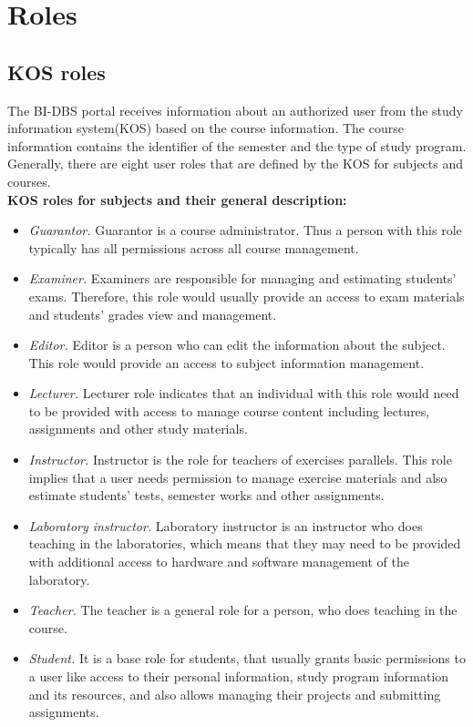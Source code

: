\section{Roles} 

\subsection{KOS roles}
The BI-DBS portal receives information about an authorized user from the study information system(KOS) based on the course information. The course information contains the identifier of the semester and the type of study program. Generally, there are eight user roles that are defined by the KOS for subjects and courses.\cite{kosapi}\\

\noindent \textbf{KOS roles for subjects and their general description:\cite{usermapapi}}

\begin{itemize}
    \item \emph{Guarantor.} Guarantor is a course administrator. Thus a person with this role typically has all permissions across all course management.
    \item \emph{Examiner.} Examiners are responsible for managing and estimating students' exams. Therefore, this role would usually provide an access to exam materials and students' grades view and management.
    \item \emph{Editor.} Editor is a person who can edit the information about the subject. This role would provide an access to subject information management.
    \item \emph{Lecturer.} Lecturer role indicates that an individual with this role would need to be provided with access to manage course content including lectures, assignments and other study materials.
    \item \emph{Instructor.} Instructor is the role for teachers of exercises parallels. This role implies that a user needs permission to manage exercise materials and also estimate students' tests, semester works and other assignments.
    \item \emph{Laboratory instructor.} Laboratory instructor is an instructor who does teaching in the laboratories, which means that they may need to be provided with additional access to hardware and software management of the laboratory.
    \item \emph{Teacher.} The teacher is a general role for a person, who does teaching in the course. 
    \item \emph{Student.} It is a base role for students, that usually grants basic permissions to a user like access to their personal information, study program information and its resources, and also allows managing their projects and submitting assignments.
\end{itemize}


